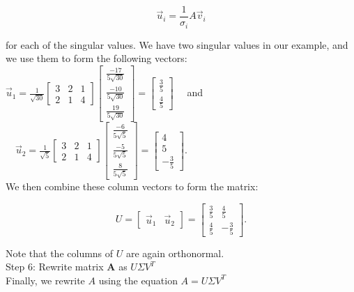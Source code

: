\documentclass[10pt]{article}
\begin{document}
$$
\vec{u}_{i}=\frac{1}{\sigma_{i}} A \vec{v}_{i}
$$

for each of the singular values. We have two singular values in our example, and we use them to form the following vectors:\\
$\vec{u}_{1}=\frac{1}{\sqrt{30}}\left[\begin{array}{lll}3 & 2 & 1 \\ 2 & 1 & 4\end{array}\right]\left[\begin{array}{c}\frac{-17}{5 \sqrt{30}} \\ \frac{-10}{5 \sqrt{30}} \\ \frac{19}{5 \sqrt{30}}\end{array}\right]=\left[\begin{array}{c}\frac{3}{5} \\ \frac{4}{5}\end{array}\right] \quad$ and $\quad \vec{u}_{2}=\frac{1}{\sqrt{5}}\left[\begin{array}{lll}3 & 2 & 1 \\ 2 & 1 & 4\end{array}\right]\left[\begin{array}{c}\frac{-6}{5 \sqrt{5}} \\ \frac{-5}{5 \sqrt{5}} \\ \frac{8}{5 \sqrt{5}}\end{array}\right]=\left[\begin{array}{c}4 \\ 5 \\ -\frac{3}{5}\end{array}\right]$.\\
We then combine these column vectors to form the matrix:

$$
U=\left[\begin{array}{ll}
\vec{u}_{1} & \vec{u}_{2}
\end{array}\right]=\left[\begin{array}{cc}
\frac{3}{5} & \frac{4}{5} \\
\frac{4}{5} & -\frac{3}{5}
\end{array}\right] .
$$

Note that the columns of $U$ are again orthonormal.\\
Step 6: Rewrite matrix $\boldsymbol{A}$ as $U \Sigma V^{T}$\\
Finally, we rewrite $A$ using the equation $A=U \Sigma V^{T}$
\end{document}
